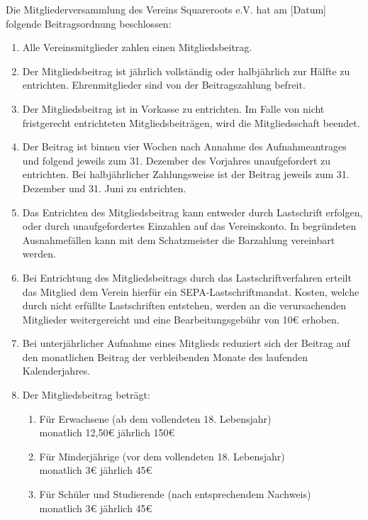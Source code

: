 \documentclass[a4paper,ngerman]{scrartcl}
\begin{document}
Die Mitgliederversammlung des Vereins Squareroots e.V. hat am [Datum] folgende Beitragsordnung beschlossen:

\begin{enumerate}
\item Alle Vereinsmitglieder zahlen einen Mitgliedsbeitrag.
\item Der Mitgliedsbeitrag ist jährlich vollständig oder halbjährlich zur Hälfte zu entrichten. Ehrenmitglieder sind von der Beitragszahlung befreit.
\item Der Mitgliedsbeitrag ist in Vorkasse zu entrichten. Im Falle von nicht fristgerecht entrichteten Mitgliedsbeiträgen, wird die Mitgliedsschaft beendet.
\item Der Beitrag ist binnen vier Wochen nach Annahme des Aufnahmeantrages und folgend jeweils zum 31. Dezember des Vorjahres unaufgefordert zu entrichten. Bei halbjährlicher Zahlungsweise ist der Beitrag jeweils zum 31. Dezember und 31. Juni zu entrichten.
\item Das Entrichten des Mitgliedsbeitrag kann entweder durch Lastschrift erfolgen, oder durch unaufgefordertes Einzahlen auf das Vereinskonto. In begründeten Ausnahmefällen kann mit dem Schatzmeister die Barzahlung vereinbart werden.
\item Bei Entrichtung des Mitgliedsbeitrags durch das Lastschriftverfahren erteilt das Mitglied dem Verein hierfür ein SEPA-Lastschriftmandat. Kosten, welche durch nicht erfüllte Lastschriften entstehen, werden an die verursachenden Mitglieder weitergereicht und eine Bearbeitungsgebühr von 10€ erhoben.
\item Bei unterjährlicher Aufnahme eines Mitglieds reduziert sich der Beitrag auf den monatlichen Beitrag der verbleibenden Monate des laufenden Kalenderjahres.
\item Der Mitgliedsbeitrag beträgt:
\begin{enumerate}
\item Für Erwachsene (ab dem vollendeten 18. Lebensjahr)\\
monatlich 12,50€    jährlich 150€
\item Für Minderjährige (vor dem vollendeten 18. Lebensjahr)\\
monatlich 3€        jährlich 45€
\item Für Schüler und Studierende (nach entsprechendem Nachweis)\\
monatlich 3€        jährlich 45€
\end{enumerate}

\end{enumerate}
\end{document}
